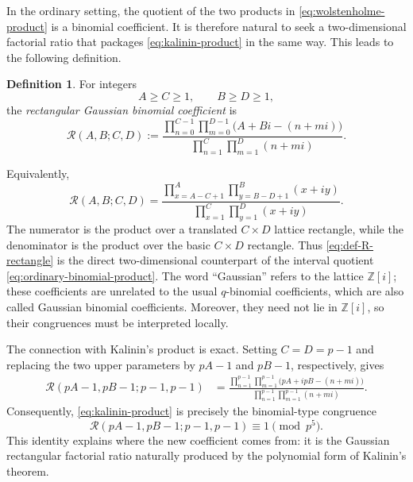 \documentclass[a4paper,american,11pt]{amsart}
\numberwithin{equation}{section}
\theoremstyle{definition}
\newtheorem{definition}[theorem]{Definition}
\newcommand{\Z}{\mathbb Z}
\newcommand{\Rect}{\mathcal R}
\begin{document}
In the ordinary setting, the quotient of the two products in \eqref{eq:wolstenholme-product} is a binomial coefficient. It is therefore natural to seek a two-dimensional factorial ratio that packages \eqref{eq:kalinin-product} in the same way. This leads to the following definition.

\begin{definition}\label{def:rectangular-coefficient}
For integers
\[
A\geq C\geq1,
\qquad
B\geq D\geq1,
\]
the \emph{rectangular Gaussian binomial coefficient} is
\begin{equation}\label{eq:def-R}
\Rect(A,B;C,D)
:=
\frac{\displaystyle
\prod_{n=0}^{C-1}\prod_{m=0}^{D-1}
\bigl(A+Bi-(n+mi)\bigr)}
{\displaystyle
\prod_{n=1}^{C}\prod_{m=1}^{D}(n+mi)}.
\end{equation}
\end{definition}

Equivalently,
\begin{equation}\label{eq:def-R-rectangle}
\Rect(A,B;C,D)
=
\frac{\displaystyle
\prod_{x=A-C+1}^{A}\prod_{y=B-D+1}^{B}(x+iy)}
{\displaystyle
\prod_{x=1}^{C}\prod_{y=1}^{D}(x+iy)}.
\end{equation}
The numerator is the product over a translated $C\times D$ lattice rectangle, while the denominator is the product over the basic $C\times D$ rectangle. Thus \eqref{eq:def-R-rectangle} is the direct two-dimensional counterpart of the interval quotient \eqref{eq:ordinary-binomial-product}. The word ``Gaussian'' refers to the lattice $\Z[i]$; these coefficients are unrelated to the usual $q$-binomial coefficients, which are also called Gaussian binomial coefficients. Moreover, they need not lie in $\Z[i]$, so their congruences must be interpreted locally.

The connection with Kalinin's product is exact. Setting $C=D=p-1$ and replacing the two upper parameters by $pA-1$ and $pB-1$, respectively, gives
\begin{align}\label{eq:gaussian-product-quotient}
\Rect(pA-1,pB-1;p-1,p-1)
&=
\frac{\displaystyle
\prod_{n=1}^{p-1}\prod_{m=1}^{p-1}
\bigl(pA+ipB-(n+mi)\bigr)}
{\displaystyle
\prod_{n=1}^{p-1}\prod_{m=1}^{p-1}(n+mi)}.
\end{align}
Consequently, \eqref{eq:kalinin-product} is precisely the binomial-type congruence
\begin{equation}\label{eq:kalinin-rectangular-special-case}
\Rect(pA-1,pB-1;p-1,p-1)\equiv1\pmod{p^5}.
\end{equation}
This identity explains where the new coefficient comes from: it is the Gaussian rectangular factorial ratio naturally produced by the polynomial form of Kalinin's theorem.
\end{document}
